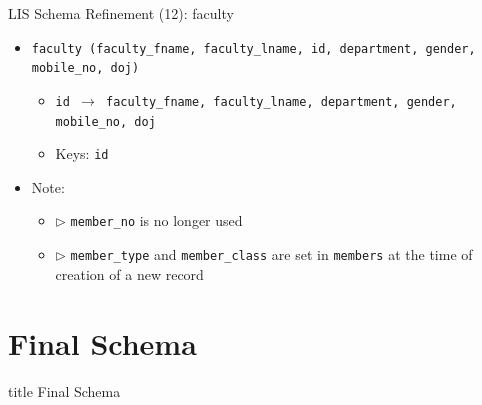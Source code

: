 \documentclass[aspectratio=169, xcolor=dvipsnames]{beamer}
\begin{document}
\begin{frame}{LIS Schema Refinement (12): faculty}
    \begin{itemize}
        \item \texttt{faculty (faculty\_fname, faculty\_lname, id, department, gender, mobile\_no, doj)}
        \begin{itemize}
            \item \texttt{id $\rightarrow$ faculty\_fname, faculty\_lname, department, gender, mobile\_no, doj}
            \item Keys: \texttt{id}
        \end{itemize}
        \item Note:
        \begin{itemize}
            \item $\triangleright$ \texttt{member\_no} is no longer used
            \item $\triangleright$ \texttt{member\_type} and \texttt{member\_class} are set in \texttt{members} at the time of creation of a new record
        \end{itemize}
    \end{itemize}
\end{frame}

\section{Final Schema}
\begin{frame}
  \vfill
  \centering
  \begin{beamercolorbox}[sep=8pt,center,shadow=true,rounded=true]{title}
    Final Schema\par%
  \end{beamercolorbox}
  \vfill
\end{frame}
\end{document}
